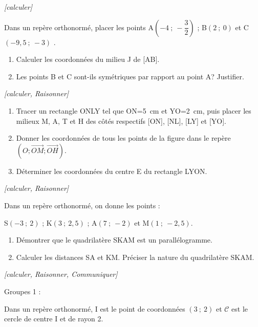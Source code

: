 \medskip


\exo \textit{[calculer]}

Dans un repère orthonormé, placer les points A$\left(-4~;~-\dfrac{3}{2}\right)$ ; B$(2~;~0)$ et  C$(-9,5~;~-3)$ .

\begin{enumerate}
\item Calculer les coordonnées du milieu J de [AB].
\item Les points B et C sont-ils symétriques par rapport au point A? Justifier.
\end{enumerate}


\medskip

\exo \textit{[calculer, Raisonner]}

\begin{enumerate}
\item Tracer un rectangle ONLY tel que ON=5~cm et YO=2~cm, puis placer les milieux M, A, T et H des côtés respectifs [ON], [NL], [LY] et [YO].
\item Donner les coordonnées de tous les points de la figure dans le repère $(O; \overrightarrow{OM};\overrightarrow{OH})$.
\item Déterminer les coordonnées du centre E du rectangle LYON.
\end{enumerate}


\medskip

\exo \textit{[calculer, Raisonner]}

Dans un repère orthonormé, on donne les points : 

S$(-3~;~2)$ ; K$(3~;~2,5)$ ; A$(7~;~-2)$ et M$(1~;~-2,5)$.

\begin{enumerate}
\item Démontrer que le quadrilatère SKAM est un parallélogramme.
\item Calculer les distances SA et KM. Préciser la nature du quadrilatère SKAM.
\end{enumerate}

\medskip

\exo \textit{[calculer, Raisonner, Communiquer]}

Groupes 1 :

Dans un repère orthonormé, I est le point de coordonnées $(3~;~2)$ et $\mathcal{C}$ est le cercle de centre I et de rayon 2.

